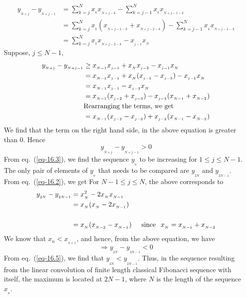 \begin{multicols}{2}
\begin{align}
y_{_{N+j}} - y_{_{N+j-1}} &= \displaystyle{\sum_{k=j}^{N}}x_{_{k}}x_{_{N+j-k}} -  \displaystyle{\sum_{k=j-1}^{N}}x_{_k}x_{_{N+j-1-k}}\label{eq-16.2}\\
&= \displaystyle{\sum_{k=j}^{N}}x_{_{k}}(x_{_{N+j-1-k}}+x_{_{N+j-2-k}}) -  \displaystyle{\sum_{k=j-1}^{N}}x_{_k}x_{_{N+j-1-k}}\nonumber\\
&= \displaystyle{\sum_{k=j}^{N}}x_{_{k}}x_{_{N+j-2-k}} - x_{_{j-1}}x_{_N}\nonumber
\end{align}
Suppose, $j \leq N-1$,
\begin{align*}
y_{_{N+j}} - y_{_{N+j-1}} &\geq x_{_{N-1}}x_{_{j-1}} + x_{_N}x_{_{j-2}} - x_{_{j-1}}x_{_N}\nonumber\\
&= x_{_{N-1}}x_{_{j-1}} + x_{_N}(x_{_{j-1}}-x_{_{j-3}})- x_{_{j-1}}x_{_N}\nonumber\\
&= x_{_{N-1}}x_{_{j-1}} - x_{_{j-3}}x_{_N}\nonumber\\
&= x_{_{N-1}}(x_{_{j-2}}+x_{_{j-3}}) - x_{_{j-3}}(x_{_{N-1}}+x_{_{N-2}})\nonumber\\
&\textup{Rearranging the terms, we get}\nonumber\\
&= x_{_{N-1}}(x_{_{j-2}} - x_{_{j-3}}) + x_{_{j-3}}(x_{_{N-1}} - x_{_{N-2}})\nonumber
\end{align*}
We find that the term on the right hand side, in the above equation is greater than 0. Hence
\begin{equation}
y_{_{N+j}} - y_{_{N+j-1}} > 0\label{eq-16.3}
\end{equation}
From eq.~(\ref{eq-16.3}), we find the sequence $y_{_n}$ to be increasing for $1 \leq j \leq N-1$. The only pair of elements of $y_{_n}$ that needs to be compared are $y_{_{2N}}$ and $y_{_{2N-1}}$. From eq.~(\ref{eq-16.2}), we get
For\hspace{0.1in} $N-1 \leq j \leq N$,\hspace{0.1in} the above corresponds to
\begin{align}
y_{_{2N}} - y_{_{2N-1}} &= x_{_N}^2 - 2x_{_N}x_{_{N-1}}\label{eq-16.4}\\
&= x_{_N}(x_{_N} - 2x_{_{N-1}})\nonumber\\~\nonumber\\
&= x_{_N}(x_{_{N-2}}-x_{_{N-1}})\hspace{0.2in}\textup{since}\hspace{0.1in} x_{_N} = x_{_{N-1}} + x_{_{N-2}}\nonumber
\end{align} 
We know that \hspace{0.1in} $x_{{n}} < x_{_{n+1}}$, \hspace{0.1in} and hence, from the above equation, we have
\begin{equation}
\Rightarrow y_{_{2N}} - y_{_{2N-1}}< 0 \label{eq-16.5}
\end{equation}
From eq.~(\ref{eq-16.5}), we find that $y_{_{2N}} < y_{_{2N-1}}$. Thus, in the sequence resulting from the linear convolution of finite length classical Fibonacci sequence with itself, the maximum is located at $2N-1$, where $N$ is the length of the sequence $x_{_n}$.


\end{multicols}
